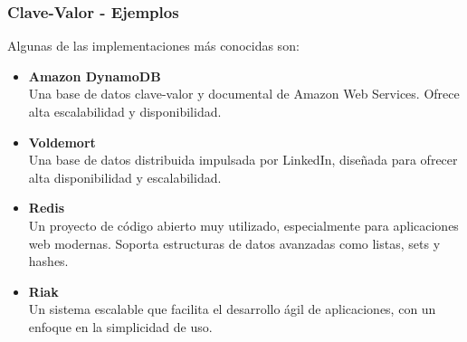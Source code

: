\begin{frame}
    \frametitle{Clave-Valor - Ejemplos}
    
    Algunas de las implementaciones más conocidas son:
    
     \begin{itemize}
        \item \textbf{Amazon DynamoDB}\\
        Una base de datos clave-valor y documental de Amazon Web Services. Ofrece alta escalabilidad y disponibilidad.
                        
         
        
        \item \textbf{Voldemort}\\
        Una base de datos distribuida impulsada por LinkedIn, diseñada para ofrecer alta disponibilidad y escalabilidad.
                        
         
        
        \item \textbf{Redis}\\
        Un proyecto de código abierto muy utilizado, especialmente para aplicaciones web modernas. Soporta estructuras de datos avanzadas como listas, sets y hashes.
                        
         
        
        \item \textbf{Riak}\\
        Un sistema escalable que facilita el desarrollo ágil de aplicaciones, con un enfoque en la simplicidad de uso.
     
     \end{itemize}
\end{frame}





%      


